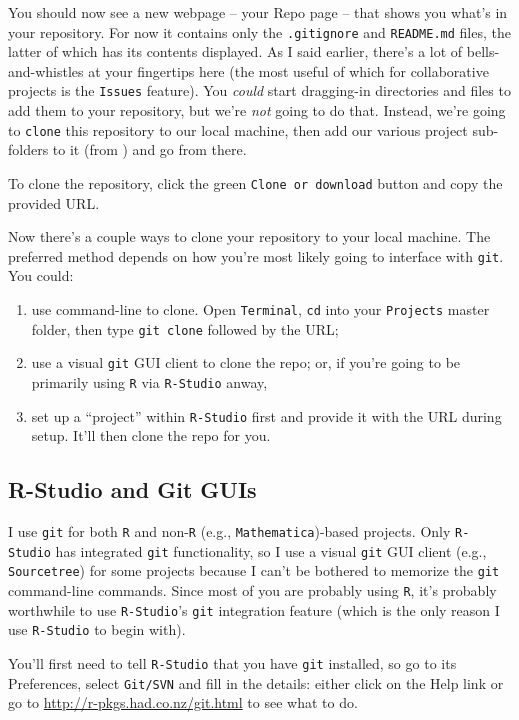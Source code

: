 \documentclass[12pt,letterpaper]{article}
\begin{document}
You should now see a new webpage -- your Repo page -- that shows you what's in your repository.  For now it contains only the  \texttt{.gitignore} and \texttt{README.md} files, the latter of which has its contents displayed.  As I said earlier, there's a lot of bells-and-whistles at your fingertips here (the most useful of which for collaborative projects is the \texttt{Issues} feature).  You \emph{could} start dragging-in directories and files to add them to your repository, but we're \emph{not} going to do that.  Instead, we're going to \texttt{clone} this repository to our local machine, then add our various project sub-folders to it (from ) and go from there.

To clone the repository, click the green \texttt{Clone or download} button and copy the provided URL.

Now there's a couple ways to clone your repository to your local machine.  The preferred method depends on how you're most likely going to interface with \texttt{git}.  You could:
\begin{enumerate}
	\item use command-line to clone.  Open \texttt{Terminal}, \texttt{cd} into your \texttt{Projects} master folder, then type \texttt{git clone} followed by the URL;
	\item use a visual \texttt{git} GUI client to clone the repo;
	or, if you're going to be primarily using \texttt{R} via \texttt{R-Studio} anway,
	\item set up a ``project'' within \texttt{R-Studio} first and provide it with the URL during setup.  It'll then clone the repo for you.
\end{enumerate} 

\subsection{R-Studio and Git GUIs}
I use \texttt{git} for both \texttt{R} and non-\texttt{R} (e.g.,  \texttt{Mathematica})-based projects.  Only  \texttt{R-Studio} has integrated  \texttt{git} functionality, so I use a visual  \texttt{git} GUI client (e.g., \texttt{Sourcetree}) for some projects because I can't be bothered to memorize the  \texttt{git} command-line commands.  Since most of you are probably using \texttt{R}, it's probably worthwhile to use \texttt{R-Studio}'s  \texttt{git} integration feature (which is the only reason I use  \texttt{R-Studio} to begin with).

You'll first need to tell  \texttt{R-Studio} that you have \texttt{git} installed, so go to its Preferences, select \texttt{Git/SVN} and fill in the details: either click on the Help link or go to 
\url{http://r-pkgs.had.co.nz/git.html} to see what to do.
\end{document}
